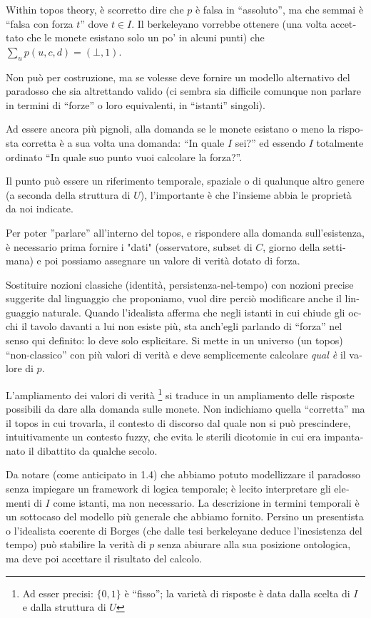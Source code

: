 \begin{italian}
Within topos theory, è scorretto dire che $p$ è falsa in ``assoluto'', ma che semmai è ``falsa con forza $t$'' dove $t \in I$. Il berkeleyano vorrebbe ottenere (una volta accettato che le monete esistano solo un po' in alcuni punti) che $\sum_u p(u,c,d) = (\bot,1)$. 

Non può per costruzione, ma se volesse deve fornire un modello alternativo del paradosso che sia altrettando valido (ci sembra sia difficile comunque non parlare in termini di ``forze'' o loro equivalenti, in ``istanti'' singoli).

Ad essere ancora più pignoli, alla domanda se le monete esistano o meno la risposta corretta è a sua volta una domanda: ``In quale $I$ sei?'' ed essendo $I$ totalmente ordinato ``In quale suo punto vuoi calcolare la forza?''. 

Il punto può essere un riferimento temporale, spaziale o di qualunque altro genere (a seconda della struttura di $U$), l'importante è che l'insieme abbia le proprietà da noi indicate.

Per poter ''parlare'' all'interno del topos, e rispondere alla domanda sull'esistenza, è necessario prima fornire i "dati" (osservatore, subset di $C$, giorno della settimana) e poi possiamo assegnare un valore di verità dotato di forza. 

Sostituire nozioni classiche (identità, persistenza-nel-tempo) con nozioni precise suggerite dal linguaggio che proponiamo, vuol dire perciò modificare anche il linguaggio naturale. Quando l'idealista afferma che negli istanti in cui chiude gli occhi il tavolo davanti a lui non esiste più, sta anch'egli parlando di ``forza'' nel senso qui definito: lo deve solo esplicitare. Si mette in un universo (un topos) ``non-classico'' con più valori di verità e deve semplicemente calcolare \emph{qual è} il valore di $p$.

L'ampliamento dei valori di verità \footnote{Ad esser precisi: $\{0,1\}$ è ``fisso''; la varietà di risposte è data dalla scelta di $I$ e dalla struttura di $U$} si traduce in un ampliamento delle risposte possibili da dare alla domanda sulle monete. Non indichiamo quella ``corretta'' ma il topos in cui trovarla, il contesto di discorso dal quale non si può prescindere, intuitivamente un contesto fuzzy, che evita le sterili dicotomie in cui era impantanato il dibattito da qualche secolo.

Da notare (come anticipato in 1.4) che abbiamo potuto modellizzare il paradosso senza impiegare un framework di logica temporale; è lecito interpretare gli elementi di $I$ come istanti, ma non necessario. La descrizione in termini temporali è un sottocaso del modello più generale che abbiamo fornito. Persino un presentista o l'idealista coerente di Borges (che dalle tesi berkeleyane deduce l'inesistenza del tempo) può stabilire la verità di $p$ senza abiurare alla sua posizione ontologica, ma deve poi accettare il risultato del calcolo.


\end{italian}
